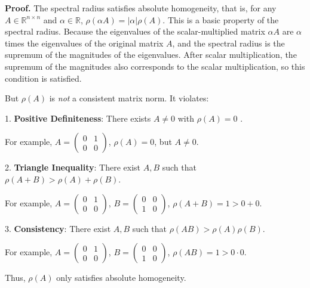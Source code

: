 \documentclass[a4paper, 11pt]{article}
\newenvironment{solution}
    {\textbf{Proof.}}
    {}
\begin{document}
\begin{solution}
	The spectral radius satisfies absolute homogeneity, that is, for any \( A \in \mathbb{R}^{n\times n} \) and \( \alpha \in \mathbb{R} \), \( \rho(\alpha A)=|\alpha|\rho(A) \). This is a basic property of the spectral radius. Because the eigenvalues of the scalar-multiplied matrix \( \alpha A \) are \( \alpha \) times the eigenvalues of the original matrix \( A \), and the spectral radius is the supremum of the magnitudes of the eigenvalues. After scalar multiplication, the supremum of the magnitudes also corresponds to the scalar multiplication, so this condition is satisfied.
	
	But \(\rho(A)\) is \textit{not} a consistent matrix norm. It violates:
	
	1. \textbf{Positive Definiteness}: There exists \(A \neq 0\) with \(\rho(A) = 0\) .
	
	For example, \( A = \begin{pmatrix} 0 & 1 \\ 0 & 0 \end{pmatrix} \), \( \rho(A) = 0 \), but \( A \neq 0 \).
	
	2. \textbf{Triangle Inequality}: There exist \(A, B\) such that \(\rho(A+B) > \rho(A) + \rho(B)\).
	
	For example, \( A = \begin{pmatrix} 0 & 1 \\ 0 & 0 \end{pmatrix} \), \( B = \begin{pmatrix} 0 & 0 \\ 1 & 0 \end{pmatrix} \), \( \rho(A + B) = 1 > 0 + 0 \).
	
	3. \textbf{Consistency}: There exist \(A, B\) such that \(\rho(AB) > \rho(A)\rho(B)\).
	
	For example, \( A = \begin{pmatrix} 0 & 1 \\ 0 & 0 \end{pmatrix} \), \( B = \begin{pmatrix} 0 & 0 \\ 1 & 0 \end{pmatrix} \), \( \rho(AB) = 1 > 0 \cdot 0 \).
	
	Thus, \(\rho(A)\) only satisfies absolute homogeneity.
\end{solution}
\end{document}
